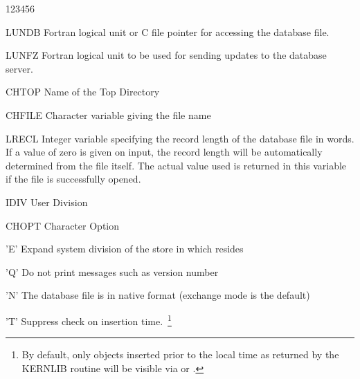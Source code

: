 
\begin{DLtt}{123456}
\item[LUNDB]Fortran logical unit or C file pointer for accessing the database
  file.
\item[LUNFZ]Fortran logical unit to be used for sending updates to the
database server.
\item[CHTOP]Name of the Top Directory
\item[CHFILE]Character variable giving the file name
\item[LRECL]Integer variable specifying the record length of the database
  file in words. If a value of zero is given on input, the record length
  will be automatically determined from the file itself. The actual
  value used is returned in this variable if the file is successfully opened.
\item[IDIV]User Division
\item[CHOPT]Character Option
  \begin{DLtt}{12}
    \item['E']Expand system division of the store in which  resides
    \item['Q']Do not print messages such as version number
    \item['N']The database file is in native format (exchange mode is the default)
    \item['T']Suppress check on insertion time.~\footnote{By default,
only objects inserted prior to the local time as returned by
the KERNLIB routine  will be visible via 
or .}


\end{DLtt}
\end{DLtt}
